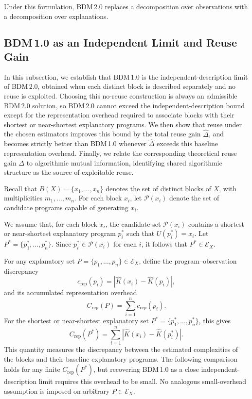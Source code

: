 \documentclass{article}
\begin{document}
Under this formulation, BDM\,2.0 replaces a decomposition over observations with a decomposition over explanations.


\subsection[BDM 1.0 as an Independent Limit and Reuse Gain]{BDM\,1.0 as an Independent Limit and Reuse Gain}
\label{sec:bdm1-independent-limit}

In this subsection, we establish that BDM\,1.0 is the independent-description limit of BDM\,2.0, obtained when each distinct block is described separately and no reuse is exploited. Choosing this no-reuse construction is always an admissible BDM\,2.0 solution, so BDM\,2.0 cannot exceed the independent-description bound except for the representation overhead required to associate blocks with their shortest or near-shortest explanatory programs. We then show that reuse under the chosen estimators improves this bound by the total reuse gain \(\hat{\Delta}\), and becomes strictly better than BDM\,1.0 whenever \(\hat{\Delta}\) exceeds this baseline representation overhead. Finally, we relate the corresponding theoretical reuse gain \(\Delta\) to algorithmic mutual information, identifying shared algorithmic structure as the source of exploitable reuse.

Recall that \(B(X)=\{x_1,\ldots,x_n\}\) denotes the set of distinct blocks of \(X\), with multiplicities \(m_1,\ldots,m_n\). For each block \(x_i\), let \(\mathcal P(x_i)\) denote the set of candidate programs capable of generating \(x_i\).

We assume that, for each block \(x_i\), the candidate set \(\mathcal P(x_i)\) contains a shortest or near-shortest explanatory program \(p_i^*\) such that \(U(p_i^*)=x_i\). Let \(P^*=\{p_1^*,\ldots,p_n^*\}\). Since \(p_i^*\in\mathcal P(x_i)\) for each \(i\), it follows that \(P^*\in\mathcal E_X\).

For any explanatory set \(P=\{p_1,\ldots,p_n\}\in\mathcal E_X\), define the program--observation discrepancy
\[
c_{\mathrm{rep}}(p_i)
=
\left|
\hat K(x_i)-\hat K(p_i)
\right|,
\]
and its accumulated representation overhead
\[
C_{\mathrm{rep}}(P)
=
\sum_{i=1}^{n}c_{\mathrm{rep}}(p_i).
\]
For the shortest or near-shortest explanatory set \(P^*=\{p_1^*,\ldots,p_n^*\}\), this gives
\[
C_{\mathrm{rep}}(P^*)
=
\sum_{i=1}^{n}
\left|
\hat K(x_i)-\hat K(p_i^*)
\right|.
\]
This quantity measures the discrepancy between the estimated complexities of the blocks and their baseline explanatory programs. The following comparison holds for any finite \(C_{\mathrm{rep}}(P^*)\), but recovering BDM\,1.0 as a close independent-description limit requires this overhead to be small. No analogous small-overhead assumption is imposed on arbitrary \(P\in\mathcal E_X\).
\end{document}
